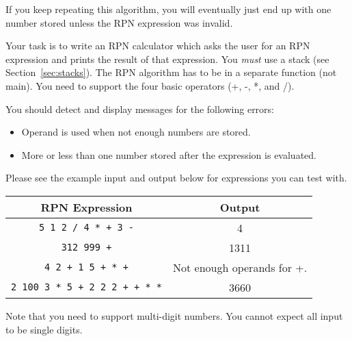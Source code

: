 \documentclass[11pt]{cselabheader}
\begin{document}
\begin{ex}
    If you keep repeating this algorithm, you will eventually just end up with
    one number stored unless the RPN expression was invalid.

    Your task is to write an RPN calculator which asks the user for an RPN
    expression and prints the result of that expression. You \emph{must} use a
    stack (see Section~\ref{sec:stacks}). The RPN algorithm has to be in a
    separate function (not main). You need to support the four basic operators
    (+, -, *, and /).

    You should detect and display messages for the following errors:
    \begin{itemize}
    \item Operand is used when not enough numbers are stored.
    \item More or less than one number stored after the expression is
      evaluated.
    \end{itemize}

    Please see the example input and output below for expressions you can test
    with.

    \begin{center}
    \begin{tabular}{cc}
      RPN Expression & Output\\
      \midrule
      \texttt{5 1 2 / 4 * + 3 -} & 4\\
      \texttt{312 999 +} & 1311 \\
      \texttt{4 2 + 1 5 + * +} & Not enough operands for +.\\
      \texttt{2 100 3 * 5 + 2 2 2 + + * *} & 3660\\
    \end{tabular}
    \end{center}

    Note that you need to support multi-digit numbers. You cannot expect all
    input to be single digits.
  \end{ex}

\printindex
\vfill

\end{document}

